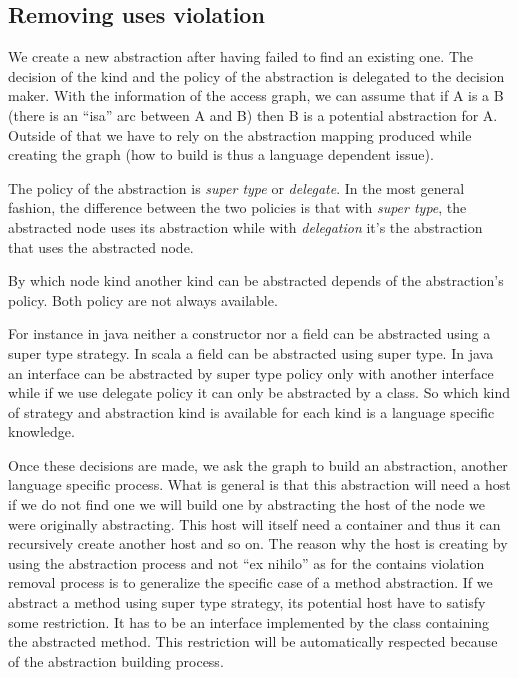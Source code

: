 \documentclass[]{article}
\begin{document}

\subsection{Removing uses violation}
We create a new abstraction after having failed to find an existing one. The decision of the kind and the policy of the abstraction is delegated to the decision maker. With the information of the access graph, we can assume that if A is a B (there is an ``isa'' arc between A and B) then B is a potential abstraction for A. Outside of that we have to rely on the abstraction mapping produced while creating the graph (how to build is thus a language dependent issue).

The policy of the abstraction is \emph{super type} or \emph{delegate}. In the most general fashion, the difference between the two policies is that with \emph{super type}, the abstracted node uses its abstraction while with \emph{delegation} it's the abstraction that uses the abstracted node.

By which node kind another kind can be abstracted depends of the abstraction's policy. Both policy are not always available.

For instance in java neither a constructor nor a field can be abstracted using a super type strategy. In scala a field can be abstracted using super type.
In java an interface can be abstracted by super type policy only with another interface while if we use delegate policy it can only be abstracted by a class.
So which kind of strategy and abstraction kind is available for each kind is a language specific knowledge. 

 
Once these decisions are made, we ask the graph to build an abstraction, another language specific process. What is general is that this abstraction will need a host if we do not find one we will build one by abstracting the host of the node we were originally abstracting. This host will itself need a container and thus it can recursively create another host and so on.
The reason why the host is creating by using the abstraction process and not ``ex nihilo'' as for the contains violation removal process is to generalize the specific case of a method abstraction.
If we abstract a method using super type strategy, its potential host have to satisfy some restriction. It has to be an interface implemented by the class containing the abstracted method. This restriction will be automatically respected because of the abstraction building process.
\end{document}
